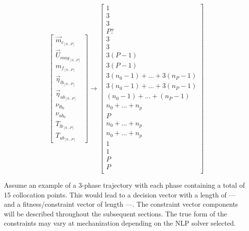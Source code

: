 \begin{multicols}{2}
\begin{equation}
\begin{bmatrix}
\vec{m}_{c_{[0 ... P]}} \\
\vec{U}_{mag_{[0 ... P]}} \\
m_{f_{[0 ... P]}} \\
\vec{\eta}_{lb_{[0 ... P]}} \\
\vec{\eta}_{ub_{[0 ... P]}} \\
\nu_{lb_{0}} \\
\nu_{ub_{0}} \\
T_{lb_{[0 ... P]}} \\
T_{ub_{[0 ... P]}}  
\end{bmatrix}
\rightarrow
\begin{bmatrix}
1 \\
3 \\
3 \\
P? \\
3 \\
3 \\
3 (P - 1) \\
3 (P - 1) \\
3(n_0-1) + ... + 3(n_P - 1) \\
3(n_0-1) + ... + 3(n_P - 1) \\
(n_0-1) + ... + (n_P - 1) \\
n_0 + ... + n_p \\
P \\
n_0 + ... + n_p \\
n_0 + ... + n_p \\
1 \\
1 \\
P \\
P \\
\end{bmatrix}
\end{equation} 
\end{multicols}
Assume an example of a 3-phase trajectory with each phase containing a total of 15 collocation points. This would lead to a decision vector with a length of --- and a fitness/constraint vector of length  ---. The constraint vector components will be described throughout the subsequent sections. The true form of the constraints may vary at mechanization depending on the NLP solver selected.


